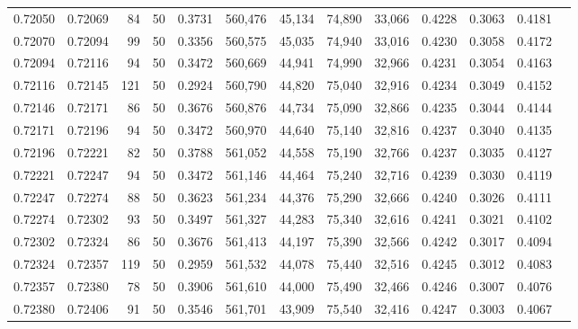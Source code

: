 \begin{tabular}{rrrrrrrrrrrrr}
0.72050 & 0.72069 &    84 &  50 &                                     0.3731 & 560,476 &  45,134 &  74,890 &  33,066 & 0.4228 & 0.3063 & 0.4181 \\
0.72070 & 0.72094 &    99 &  50 &                                     0.3356 & 560,575 &  45,035 &  74,940 &  33,016 & 0.4230 & 0.3058 & 0.4172 \\
0.72094 & 0.72116 &    94 &  50 &                                     0.3472 & 560,669 &  44,941 &  74,990 &  32,966 & 0.4231 & 0.3054 & 0.4163 \\
0.72116 & 0.72145 &   121 &  50 &                                     0.2924 & 560,790 &  44,820 &  75,040 &  32,916 & 0.4234 & 0.3049 & 0.4152 \\
0.72146 & 0.72171 &    86 &  50 &                                     0.3676 & 560,876 &  44,734 &  75,090 &  32,866 & 0.4235 & 0.3044 & 0.4144 \\
0.72171 & 0.72196 &    94 &  50 &                                     0.3472 & 560,970 &  44,640 &  75,140 &  32,816 & 0.4237 & 0.3040 & 0.4135 \\
0.72196 & 0.72221 &    82 &  50 &                                     0.3788 & 561,052 &  44,558 &  75,190 &  32,766 & 0.4237 & 0.3035 & 0.4127 \\
0.72221 & 0.72247 &    94 &  50 &                                     0.3472 & 561,146 &  44,464 &  75,240 &  32,716 & 0.4239 & 0.3030 & 0.4119 \\
0.72247 & 0.72274 &    88 &  50 &                                     0.3623 & 561,234 &  44,376 &  75,290 &  32,666 & 0.4240 & 0.3026 & 0.4111 \\
0.72274 & 0.72302 &    93 &  50 &                                     0.3497 & 561,327 &  44,283 &  75,340 &  32,616 & 0.4241 & 0.3021 & 0.4102 \\
0.72302 & 0.72324 &    86 &  50 &                                     0.3676 & 561,413 &  44,197 &  75,390 &  32,566 & 0.4242 & 0.3017 & 0.4094 \\
0.72324 & 0.72357 &   119 &  50 &                                     0.2959 & 561,532 &  44,078 &  75,440 &  32,516 & 0.4245 & 0.3012 & 0.4083 \\
0.72357 & 0.72380 &    78 &  50 &                                     0.3906 & 561,610 &  44,000 &  75,490 &  32,466 & 0.4246 & 0.3007 & 0.4076 \\
0.72380 & 0.72406 &    91 &  50 &                                     0.3546 & 561,701 &  43,909 &  75,540 &  32,416 & 0.4247 & 0.3003 & 0.4067 \\

\end{tabular}
